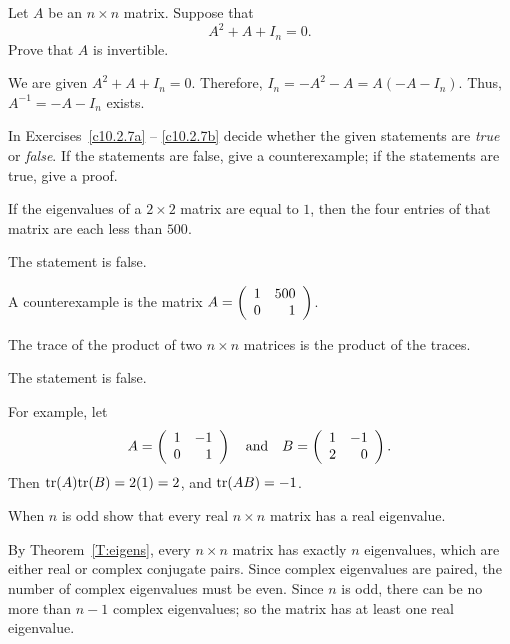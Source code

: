 \documentclass{ximera}
\begin{document}
\begin{exercise} \label{c10.2.6}
Let $A$ be an $n\times n$ matrix.  Suppose that 
\[
A^2 + A + I_n = 0.
\]
Prove that $A$ is invertible.

\begin{solution}

We are given $A^2 + A + I_n = 0$.  Therefore, $I_n = -A^2 - A =
A(-A - I_n)$.  Thus, $A^{-1} = -A - I_n$ exists.

\end{solution}
\end{exercise}

\noindent In Exercises~\ref{c10.2.7a} -- \ref{c10.2.7b} decide whether 
the given statements are {\em true\/} or {\em false\/}. If the 
statements are false, give a counterexample; if the statements are true, 
give a proof.
\begin{exercise} \label{c10.2.7a}
If the eigenvalues of a $2\times 2$ matrix are equal to $1$,
then the four entries of that matrix are each less than $500$.

\begin{solution}

\ans The statement is false. 

\soln  A counterexample is the matrix $A = \left(\begin{array}{rr} 1 & 500\\ 0 &1\end{array}\right)$.

\end{solution}
\end{exercise}
\begin{exercise} \label{c10.2.7b}
The trace of the product of two $n\times n$ matrices is the
product of the traces.

\begin{solution}
\ans The statement is false.

\soln For example, let
\[
A = \left(\begin{array}{rr} 1 & -1\\ 0 &1\end{array}\right) \quad\mbox{and}\quad B = \left(\begin{array}{rr} 1 & -1\\ 2 &0\end{array}\right).
\]
Then ${\rm tr}(A){\rm tr}(B) = 2(1) = 2$, and ${\rm tr}(AB) = -1$.

\end{solution}
\end{exercise}

\begin{exercise} \label{c10.2.8}
When $n$ is odd show that every real $n\times n$ matrix has a real
eigenvalue. 

\begin{solution}

By Theorem~\ref{T:eigens}, every
$n \times n$ matrix has exactly $n$ eigenvalues, which are either
real or complex conjugate pairs.  Since complex eigenvalues are
paired, the number of complex eigenvalues must be even.  Since $n$ is
odd, there can be no more than $n - 1$ complex eigenvalues; so the
matrix has at least one real eigenvalue.

\end{solution}
\end{exercise}
\end{document}
